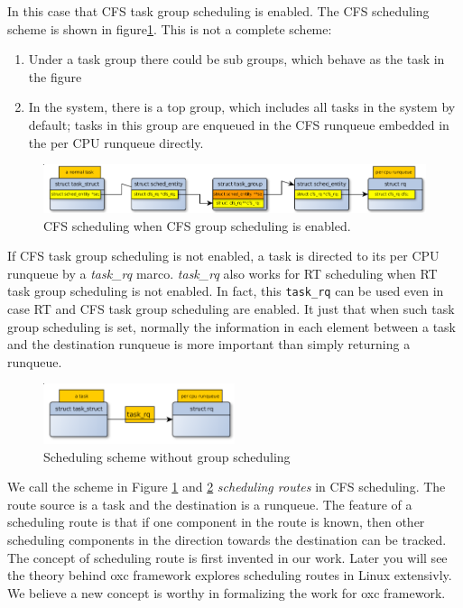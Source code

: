In this case that CFS task group scheduling is enabled. The CFS
scheduling scheme is shown in figure\ref{fig:cfs_routing_tg}.  This is
not a complete scheme: 

\begin{enumerate}
\item Under a task group there could be sub groups, which behave as
  the task in the figure 
\item In the system, there is a top group, which includes all tasks in
  the system by default; tasks in this group are enqueued in the CFS
  runqueue embedded in the per CPU runqueue directly.
\end{enumerate}
\begin{figure}[htbp]
        \centering
        \includegraphics[width=\textwidth]{images/cfs_scheduling_scheme_tg}
        \caption{CFS scheduling when CFS group scheduling is enabled.}
        \label{fig:cfs_routing_tg}
\end{figure}

If CFS task group scheduling is not enabled, a task is directed to its
per CPU runqueue by a \emph{task\_rq} marco. \emph{task\_rq} also
works for RT scheduling when RT task group scheduling is not enabled.
In fact, this \texttt{task\_rq} can be used even in case RT and CFS
task group scheduling are enabled. It just that when such task group
scheduling is set, normally the information in each element between  
a task and the destination runqueue is more important than simply 
returning a runqueue.
\begin{figure}[htbp]
        \centering
        \includegraphics[height=0.1\textheight,width=0.5\textwidth]{images/scheduling_scheme_no_tg}
        \caption{Scheduling scheme without group scheduling}
        \label{fig:routing_no_tg}
\end{figure}

We call the scheme in Figure \ref{fig:cfs_routing_tg} and
\ref{fig:routing_no_tg} \emph{scheduling routes} in CFS scheduling.
The route source is a task and the destination is a runqueue.  The
feature of a scheduling route is that if one component in the route is
known, then other scheduling components in the direction towards the
destination can be tracked.  The concept of scheduling route is first
invented in our work.  Later you will see the theory behind oxc
framework explores scheduling routes in Linux extensivly. We believe a
new concept is worthy in formalizing the work for oxc framework.

